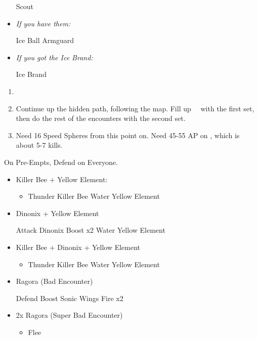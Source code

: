 \begin{equip}
  \begin{itemize}
    \wakkaf Scout
    \item \textit{If you have them:}
    	\begin{itemize}
    	\wakkaf Ice Ball
    	\wakkaf Armguard
    	\end{itemize}
    \item \textit{If you got the Ice Brand:}
          \begin{itemize}
            \tidusf Ice Brand
          \end{itemize}
  \end{itemize}
\end{equip}
\begin{enumerate}[resume]
  \item \formation{\tidus}{\yuna}{\wakka}
  \item Continue up the hidden path, following the map. Fill up \valefor\ \od\ with the first set, then do the rest of the encounters with the second set.
  \item Need 16 Speed Spheres from this point on. Need 45-55 AP on \tidus, which is about 5-7 kills.
\end{enumerate}
\vfill
\begin{encounters}
On Pre-Empts, Defend on Everyone.
\begin{itemize}
	\item Killer Bee + Yellow Element:
	\begin{itemize}
		\tidusf Defend
		\summon{\valefor}
		\valeforf Boost
		\item Thunder Killer Bee
		\valeforf Water Yellow Element
	\end{itemize}
	\item Dinonix + Yellow Element
	\begin{itemize}
		\tidusf Attack Dinonix
		\summon{\valefor}
		\valeforf Boost x2
		\valeforf Water Yellow Element
	\end{itemize}
	\item Killer Bee + Dinonix + Yellow Element
	\begin{itemize}
		\tidusf Attack Dinonix
		\summon{\valefor}
		\valeforf Boost
		\item Thunder Killer Bee
		\valeforf Water Yellow Element
	\end{itemize}
	\item Ragora (Bad Encounter)
	\begin{itemize}
		\tidusf Defend
		\summon{\valefor}
		\valeforf Boost
		\valeforf Sonic Wings
		\valeforf Fire x2
	\end{itemize}
	\item 2x Ragora (Super Bad Encounter)
	\begin{itemize}
		\tidusf Defend
		\summon{\valefor}
		\valeforf Boost
		\valeforf Dismiss
		\wakkaf Defend
		\item Flee
	\end{itemize}
\end{itemize}
\end{encounters}
